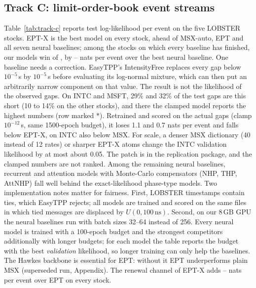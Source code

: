 \subsection{Track C: limit-order-book event streams}
Table~\ref{tab:track-c} reports test log-likelihood per event on the five LOBSTER
stocks. EPT-X is the best model on every stock, ahead of MSX-auto, EPT and all seven
neural baselines; among the stocks on which every baseline has finished, our models win
\trackCwins{} of \trackCdone{}, by \trackCmarginLo--\trackCmarginHi{} nats per event over the
best neural baseline. One baseline needs a correction. EasyTPP's IntensityFree replaces every gap below
$10^{-5}$\,s by $10^{-5}$\,s before evaluating its log-normal mixture, which can then put an
arbitrarily narrow component on that value. The result is not the likelihood of the observed gaps.
On INTC and MSFT, 29\% and 32\% of the test gaps are this short (10 to 14\% on the other stocks),
and there the clamped model reports the highest numbers (row marked $\ast$). Retrained and scored
on the actual gaps (clamp $10^{-12}$\,s, same 1500-epoch budget), it loses 1.1 and 0.7 nats per
event and falls below EPT-X, on INTC also below MSX. For scale, a denser MSX dictionary (40 instead
of 12 rates) or sharper EPT-X atoms change the INTC validation likelihood by at most about 0.05.
The patch is in the replication package, and the clamped numbers are not ranked.
Among the remaining neural baselines, recurrent and attention models with Monte-Carlo compensators (NHP, THP, AttNHP) fall well behind the
exact-likelihood phase-type models. Two implementation notes matter for fairness. First,
LOBSTER timestamps contain ties, which EasyTPP rejects; all models are trained and
scored on the same files in which tied messages are displaced by $U(0,100\,\text{ns})$.
Second, on our 8\,GB GPU the neural baselines run with batch sizes 32--64 instead of 256.
Every neural model is trained with a 100-epoch budget and the strongest competitors
additionally with longer budgets; for each model the table reports the budget with the
best \emph{validation} likelihood, so longer training can only help the baselines. The
Hawkes backbone is essential for EPT: without it EPT underperforms plain MSX (superseded
run, Appendix). The renewal channel of EPT-X adds \eptxGainLo--\eptxGainHi{} nats per event over EPT on
every stock.

\begin{table}[!htbp]\centering\small
\caption{LOBSTER order books: test log-likelihood per event (higher is better; mean $\pm$
s.d.\ over seeds where several were run). Bold: best; underlined: second best; shaded: our models.
$^\ast$As shipped, IntensityFree clamps gaps at $10^{-5}$\,s before scoring, so its score is not
the likelihood of the observed data; it is greyed and not ranked. The IntensityFree row is
retrained and scored on the actual gaps.}\label{tab:track-c}
\setlength{\tabcolsep}{5pt}

\end{table}

